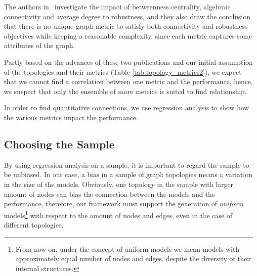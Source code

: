 The authors in~\cite{algebraic2} investigate the impact of betweenness centrality, algebraic connectivity and average degree to robustness, and they also draw the conclusion that there is no unique graph metric to satisfy both connectivity and robustness objectives while keeping a reasonable complexity, since each metric captures some attributes of the graph.

Partly based on the advances of these two publications and our initial assumption of the topologies and their metrics (Table \ref{tab:topology_metrics2}), we expect that we cannot find a correlation between one metric and the performance, hence, we suspect that only the ensemble of more metrics is suited to find relationship.

In order to find quantitative connections, we use regression analysis to show how the various metrics impact the performance. 

\subsection{Choosing the Sample}

By using regression analysis on a sample, it is important to regard the sample to be unbiased. In our case, a bias in a sample of graph topologies means a variation in the size of the models. Obviously, one topology in the sample with larger amount of nodes can bias the connection between the models and the performance, therefore, our framework must support the generation of \textit{uniform} models\footnote{From now on, under the concept of uniform models we mean models with approximately equal number of nodes and edges, despite the diversity of their internal structures.} with respect to the amount of nodes and edges, even in the case of different topologies.
